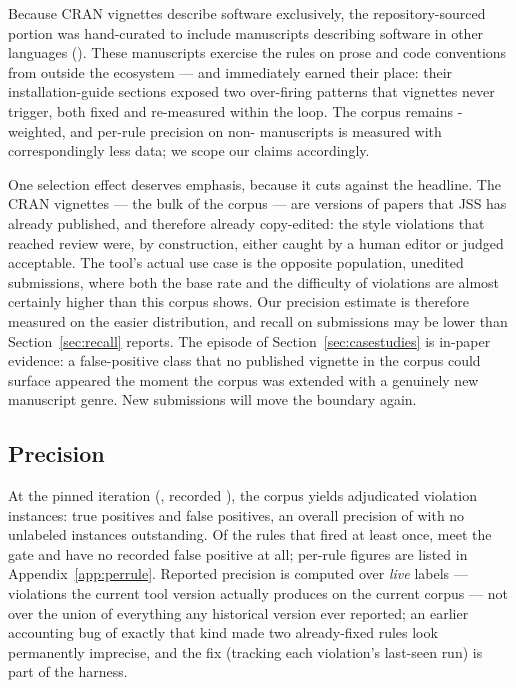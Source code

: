 \documentclass[nojss,article]{jss}
\newcommand{\rulelink}[1]{\hyperlink{rule:#1}{\code{#1}}}
\begin{document}
Because CRAN vignettes describe  software exclusively,
the repository-sourced portion was hand-curated to include
\StatCorpusNonR{} manuscripts describing software in other languages
(\StatCorpusNonRLangs{}). These manuscripts exercise the rules on
prose and code conventions from outside the  ecosystem
--- and immediately earned their place: their installation-guide
sections exposed two over-firing patterns that 
vignettes never trigger, both fixed and re-measured within the loop.
The corpus remains -weighted, and per-rule precision on
non- manuscripts is measured with correspondingly less
data; we scope our claims accordingly.

One selection effect deserves emphasis, because it cuts against the
headline. The \StatCorpusCran{} CRAN vignettes --- the bulk of the
corpus --- are versions of papers that JSS has already published, and
therefore already copy-edited: the style violations that reached
review were, by construction, either caught by a human editor or
judged acceptable. The tool's actual use case is the opposite
population, unedited submissions, where both the base rate and the
difficulty of violations are almost certainly higher than this corpus
shows. Our precision estimate is therefore measured on the easier
distribution, and recall on submissions may be lower than
Section~\ref{sec:recall} reports. The \rulelink{JSS-CODE-003} episode
of Section~\ref{sec:casestudies} is in-paper evidence: a
false-positive class that no published  vignette in the
corpus could surface appeared the moment the corpus was extended with
a genuinely new manuscript genre. New submissions will move the
boundary again.

\subsection{Precision}
\label{sec:precision}

At the pinned iteration (\code{\StatPinnedIteration}, recorded
\StatPinnedIterationDate{}), the corpus yields
\StatPrecisionReviewed{} adjudicated violation instances:
\StatPrecisionTP{} true positives and \StatPrecisionFP{} false
positives, an overall precision of \StatPrecisionOverall{} with no
unlabeled instances outstanding. Of the \StatRulesMeasured{} rules
that fired at least once, \StatRulesPassing{} meet the \StatGatePct{}
gate and \StatRulesPerfect{} have no recorded false positive at all;
per-rule figures are listed in Appendix~\ref{app:perrule}.
Reported precision is computed over \emph{live} labels --- violations
the current tool version actually produces on the current corpus ---
not over the union of everything any historical version ever
reported; an earlier accounting bug of exactly that kind made two
already-fixed rules look permanently imprecise, and the fix
(tracking each violation's last-seen run) is part of the harness.
\end{document}
